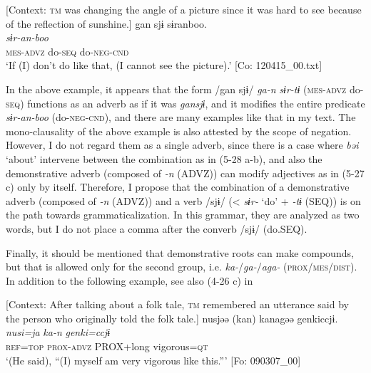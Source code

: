 \ea \label{ex:5:29}   [Context: \textsc{tm} was changing the angle of a picture since it was hard to see because of the reflection of sunshine.]
\glll  gan  sjɨ  sɨranboo.\\
\textit{}  \textit{}  \textit{sɨr-an-boo}\\
\textsc{mes}-\textsc{advz}  do-\textsc{seq}  do-\textsc{neg}-\textsc{cnd}\\
\glt ‘If (I) don’t do like that, (I cannot see the picture).’ [Co: 120415\_00.txt]
\z

In the above example, it appears that the form /gan sjɨ/ \textit{ga-n} \textit{sɨr-tɨ} (\textsc{mes}-\textsc{advz} do-\textsc{seq}) functions as an adverb as if it was \textit{gansjɨ}, and it modifies the entire predicate \textit{sɨr-an-boo} (do-\textsc{neg}-\textsc{cnd}), and there are many examples like that in my text. The mono-clausality of the above example is also attested by the scope of negation. However, I do not regard them as a single adverb, since there is a case where \textit{bəi} ‘about’ intervene between the combination as in (5-28 a-b), and also the demonstrative adverb (composed of \textit{{}-n} (ADVZ)) can modify adjectives as in (5-27 c) only by itself. Therefore, I propose that the combination of a demonstrative adverb (composed of \textit{{}-n} (ADVZ)) and a verb /sjɨ/ (< \textit{sɨr-} ‘do’ + \textit{{}-tɨ} (SEQ)) is on the path towards grammaticalization. In this grammar, they are analyzed as two words, but I do not place a comma after the converb /sjɨ/ (do.SEQ).

  Finally, it should be mentioned that demonstrative roots can make compounds, but that is allowed only for the second group, i.e. \textit{ka-}/\textit{ga-}/\textit{aga-} (\textsc{prox}/\textsc{mes}/\textsc{dist}). In addition to the following example, see also (4-26 c) in 

\ea \label{ex:5:30}   [Context: After talking about a folk tale, \textsc{tm} remembered an utterance said by the person who originally told the folk tale.]
\glll  nusjəə  (kan)  kanagəə  {\textbar}genki{\textbar}ccjɨ.\\
\textit{nusi=ja}  \textit{ka-n}  \textit{}  \textit{genki=ccjɨ}\\
\textsc{ref}=\textsc{top}  \textsc{prox}-\textsc{advz}  PROX+long  vigorous=\textsc{qt}\\
\glt ‘(He said), “(I) myself am very vigorous like this.”’ [Fo: 090307\_00]
\z

